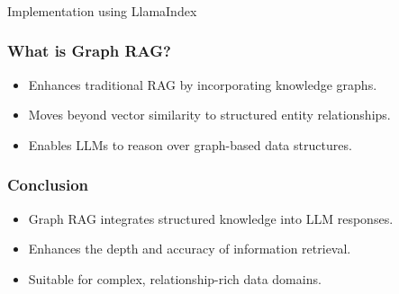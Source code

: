 \begin{frame}[fragile]\frametitle{}
\begin{center}
{\Large Implementation using LlamaIndex}
\end{center}
\end{frame}

\begin{frame}[fragile]\frametitle{What is Graph RAG?}
  \begin{itemize}
    \item Enhances traditional RAG by incorporating knowledge graphs.
    \item Moves beyond vector similarity to structured entity relationships.
    \item Enables LLMs to reason over graph-based data structures.
  \end{itemize}
\end{frame}



























\begin{frame}[fragile]\frametitle{Conclusion}
  \begin{itemize}
    \item Graph RAG integrates structured knowledge into LLM responses.
    \item Enhances the depth and accuracy of information retrieval.
    \item Suitable for complex, relationship-rich data domains.
  \end{itemize}
\end{frame}



